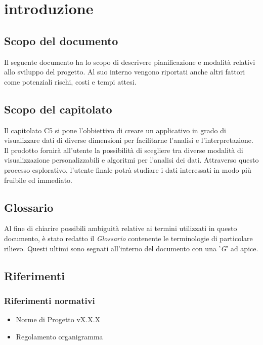 \section{introduzione}
\subsection{Scopo del documento}
Il seguente documento ha lo scopo di descrivere pianificazione e modalità relativi allo sviluppo del progetto.
Al suo interno vengono riportati anche altri fattori come potenziali rischi, costi e tempi attesi.

\subsection{Scopo del capitolato}
Il capitolato C5 si pone l'obbiettivo di creare un applicativo in grado di visualizzare dati di diverse dimensioni 
per facilitarne l'analisi e l'interpretazione. Il prodotto fornirà all'utente la possibilità di scegliere tra diverse
modalità di visualizzazione personalizzabili e algoritmi per l'analisi dei dati. Attraverso questo processo esplorativo,
l'utente finale potrà studiare i dati interessati in modo più fruibile ed immediato.

\subsection{Glossario}
Al fine di chiarire possibili ambiguità relative ai termini utilizzati in questo documento, è stato redatto il \textit{Glossario} contenente le terminologie di particolare rilievo.
Questi ultimi sono segnati all'interno del documento con una '\textit{G}' ad apice. 

\subsection{Riferimenti}
\subsubsection{Riferimenti normativi}
\begin{itemize}
    \item Norme di Progetto vX.X.X
    \item Regolamento organigramma
\end{itemize}
